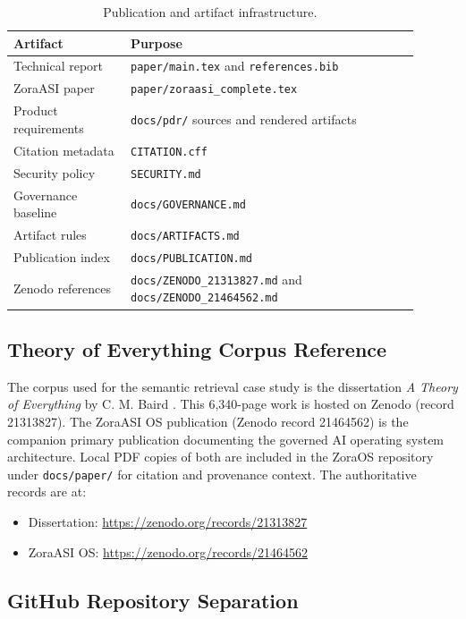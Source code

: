 \documentclass[11pt]{article}
\begin{document}
\begin{table}[ht]
\centering
\caption{Publication and artifact infrastructure.}
\label{tab:pub}
\begin{tabular}{p{0.26\linewidth} p{0.64\linewidth}}
\toprule
\textbf{Artifact} & \textbf{Purpose} \\
\midrule
Technical report & \texttt{paper/main.tex} and \texttt{references.bib} \\
ZoraASI paper & \texttt{paper/zoraasi\_complete.tex} \\
Product requirements & \texttt{docs/pdr/} sources and rendered artifacts \\
Citation metadata & \texttt{CITATION.cff} \\
Security policy & \texttt{SECURITY.md} \\
Governance baseline & \texttt{docs/GOVERNANCE.md} \\
Artifact rules & \texttt{docs/ARTIFACTS.md} \\
Publication index & \texttt{docs/PUBLICATION.md} \\
Zenodo references & \texttt{docs/ZENODO\_21313827.md} and \texttt{docs/ZENODO\_21464562.md} \\
\bottomrule
\end{tabular}
\end{table}

\subsection{Theory of Everything Corpus Reference}

The corpus used for the semantic retrieval case study is the dissertation \emph{A Theory of Everything} by C. M. Baird \citep{baird2026dissertation_zenodo}. This 6,340-page work is hosted on Zenodo (record 21313827). The ZoraASI OS publication \citep{baird2026zoraasi_zenodo} (Zenodo record 21464562) is the companion primary publication documenting the governed AI operating system architecture. Local PDF copies of both are included in the ZoraOS repository under \texttt{docs/paper/} for citation and provenance context. The authoritative records are at:

\begin{itemize}
  \item Dissertation: \url{https://zenodo.org/records/21313827}
  \item ZoraASI OS: \url{https://zenodo.org/records/21464562}
\end{itemize}

\subsection{GitHub Repository Separation}
\end{document}
